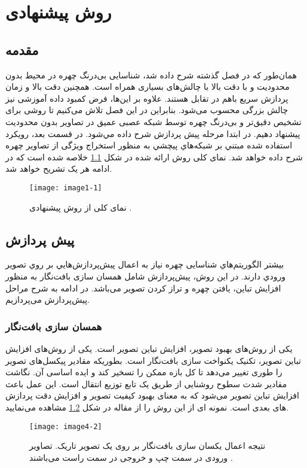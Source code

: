 \chapter{ روش پیشنهادی }
\section{مقدمه}

همان‌طور که در فصل‌ گذشته شرح داده شد، شناسایی بی‌درنگ چهره در محیط بدون محدودیت و با دقت بالا با چالش‌های بسیاری همراه است. همچنین دقت بالا و زمان پردازش سریع باهم در تقابل هستند. علاوه بر این‌ها، فرض ‌کمبود داده آموزشی نیز چالش بزرگی محسوب می‌شود. بنابراین در این فصل تلاش می‌کنیم تا روشی برای تشخیص دقیق‌تر و بی‌درنگ چهره توسط شبکه عصبی عمیق در تصاویر بدون محدودیت پیشنهاد دهیم. در ابتدا مرحله پيش پردازش شرح داده مي‌شود. در قسمت بعد، رويكرد استفاده شده مبتني بر شبكه‌هاي پيچشي به منظور استخراج ویژگی از تصاوير چهره شرح داده خواهد شد. نمای کلی روش ارائه شده در شكل \ref{image4-1} خلاصه شده است كه در ادامه هر يک تشريح خواهد شد. 
\begin{figure}[h]
\centering
  \texttt{[image: image1-1]}
  \caption{نمای کلی از روش پیشنهادی \cite{ref1}.}
  \label{image4-1}
\end{figure}

\section{پیش پردازش}
بيشتر الگوريتم‌ها‌ي شناسایی چهره نياز به اعمال پيش‌پردازش‌هايي بر روي تصوير ورودي دارند. در این روش، پیش‌پردازش شامل همسان سازی بافت‌نگار به منظور افزایش تباین، یافتن چهره و تراز کردن تصویر می‌باشد. در ادامه به شرح مراحل پیش‌پردازش می‌پردازیم.
\subsection{همسان سازی بافت‌نگار}
یکی از روش‌های بهبود تصویر، افزایش تباین تصویر است. یکی از روش‌های افزایش تباین تصویر، تکنیک یکنواخت سازی بافت‌نگار است. بطوریکه مقادیر پیکسل‌های تصویر را طوری تغییر می‌دهد تا کل بازه ممکن را تسخیر کند و ایده اساسی آن. نگاشت مقادیر شدت سطوح روشنایی از طریق یک تابع توزیع انتقال است. این عمل باعث افزایش تباین تصویر  می‌شود که به معنای بهبود کیفیت تصویر و افزایش دقت پردازش های بعدی است. نمونه ای از این روش را از مقاله \cite{s18092995} در شکل \ref{image4-2}  مشاهده می‌نمایید.
\begin{figure}[h]
\centering
\texttt{[image: image4-2]}
\caption{نتیجه اعمال یکسان سازی بافت‌نگار بر روی یک تصویر تاریک. تصاویر ورودی در سمت چپ و خروجی در سمت راست می‌باشند \cite{s18092995}.}
\label{image4-2}
\end{figure}

